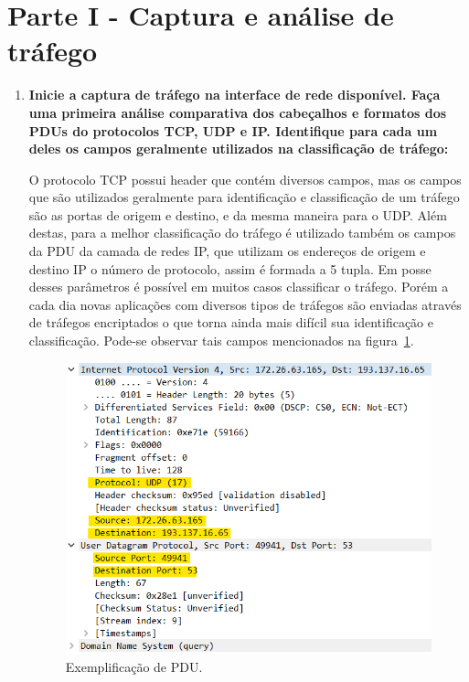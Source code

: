 \documentclass{llncs}
\begin{document}
%
\section{Parte I - Captura e análise de tráfego}


\begin{enumerate}[\textbf{a)}]
  \item \textbf{ Inicie a captura de tráfego na interface de rede disponível. Faça uma primeira análise comparativa dos cabeçalhos e formatos dos PDUs do protocolos TCP, UDP e IP. Identifique para cada um deles os campos geralmente utilizados na classificação de tráfego:}
  \vspace{5mm}
    \par O protocolo TCP possui header que contém diversos campos, mas os campos que são utilizados geralmente para identificação e classificação de um tráfego são as portas de origem e destino, e da mesma maneira para o UDP. Além destas, para a melhor classificação do tráfego é utilizado também os campos da PDU da camada de redes IP, que utilizam os endereços de origem e destino IP o número de protocolo, assim é formada a 5 tupla. Em posse desses parâmetros é possível em muitos casos classificar o tráfego. Porém a cada dia novas aplicações com diversos tipos de tráfegos são enviadas através de tráfegos encriptados o que torna ainda mais difícil sua identificação e classificação. Pode-se observar tais campos mencionados na figura~\ref{fig:PDU}.
    
  
  \begin{figure}[h]
    \includegraphics[scale=0.65]{PDU.png}
    \centering
    \caption{Exemplificação de PDU.}
    \label{fig:PDU}
    \end{figure}
\end{enumerate}
\end{document}

